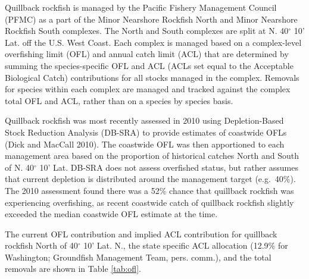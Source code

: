 \documentclass[11pt,
  english,
  letterpaper,
]{article}
\begin{document}
\leavevmode\tagmcend\tagstructend


Quillback rockfish is managed by the Pacific Fishery Management Council (PFMC) as a part of the Minor Nearshore Rockfish North and Minor Nearshore Rockfish South complexes. The North and South complexes are split at N. 40{\(^\circ\)\leavevmode\tagmcend\tagstructend} 10' Lat. off the U.S. West Coast. Each complex is managed based on a complex-level overfishing limit (OFL) and annual catch limit (ACL) that are determined by summing the species-specific OFL and ACL (ACLs set equal to the Acceptable Biological Catch) contributions for all stocks managed in the complex. Removals for species within each complex are managed and tracked against the complex total OFL and ACL, rather than on a species by species basis.

\leavevmode\tagmcend\tagstructend\par


Quillback rockfish was most recently assessed in 2010 using Depletion-Based Stock Reduction Analysis (DB-SRA) to provide estimates of coastwide OFLs {(Dick and MacCall 2010)\leavevmode\tagmcend\tagstructend}. The coastwide OFL was then apportioned to each management area based on the proportion of historical catches North and South of N. 40{\(^\circ\)\leavevmode\tagmcend\tagstructend} 10' Lat. DB-SRA does not assess overfished status, but rather assumes that current depletion is distributed around the management target (e.g.~40\%). The 2010 assessment found there was a 52\% chance that quillback rockfish was experiencing overfishing, as recent coastwide catch of quillback rockfish slightly exceeded the median coastwide OFL estimate at the time.

\leavevmode\tagmcend\tagstructend\par


The current OFL contribution and implied ACL contribution for quillback rockfish North of 40{\(^\circ\)\leavevmode\tagmcend\tagstructend} 10' Lat. N., the state specific ACL allocation (12.9\% for Washington; Groundfish Management Team, pers. comm.), and the total removals are shown in Table \ref{tab:ofl}.
\end{document}
